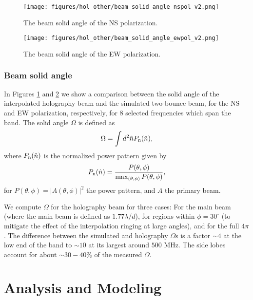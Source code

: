 \begin{figure}[h!]
\begin{center}
\texttt{[image: figures/hol\_other/beam\_solid\_angle\_nspol\_v2.png]}
\caption{The beam solid angle of the NS polarization. \label{bsans}}
\end{center}
\end{figure}

\begin{figure}[h!]
\begin{center}
\texttt{[image: figures/hol\_other/beam\_solid\_angle\_ewpol\_v2.png]}
\caption{The beam solid angle of the EW polarization. \label{bsaew}}
\end{center}
\end{figure}

\subsubsection{Beam solid angle}

In Figures \ref{bsans} and \ref{bsaew} we show a comparison between the solid angle of the interpolated holography beam and the simulated two-bounce beam, for the NS and EW polarization, respectively, for 8 selected frequencies which span the band. The solid angle $\Omega$ is defined as
\begin{equation}
\Omega = \int d^2 \hat{n} P_{\rm n}(\hat{n}), \label{Omega}
\end{equation}
where $P_{\rm n}(\hat{n})$ is the normalized power pattern given by
\begin{equation}
P_{\rm n}(\hat{n}) = \frac{P(\theta, \phi)}{\max_{(\theta, \phi)} {P(\theta, \phi)}},
\end{equation}
for $P(\theta, \phi) = |A(\theta, \phi)|^2$ the power pattern, and $A$ the primary beam.

We compute $\Omega$ for the holography beam for three cases: For the main beam (where the main beam is defined as $1.77\lambda/d$),  for regions within $\phi = 30^\circ$ (to mitigate the effect of the interpolation ringing at large angles), and for the full $4\pi$. The difference between the simulated and holography $\Omega$s is a factor $\sim 4$ at the low end of the band to $\sim 10$ at its largest around $500$ MHz.  The side lobes account for about $\sim 30-40\%$ of the measured $\Omega$.

\section{Analysis and Modeling} \label{ch:hol:sec:analysis}

